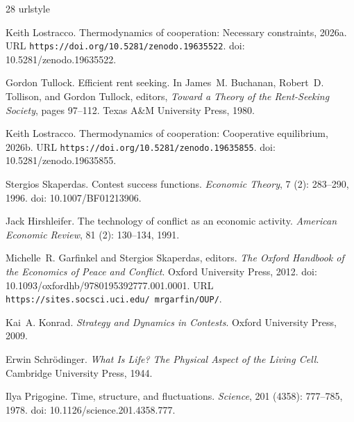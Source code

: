 \documentclass[11pt]{article}
\theoremstyle{plain}
\theoremstyle{definition}
\theoremstyle{remark}
\begin{document}
\begin{thebibliography}{28}
\providecommand{\natexlab}[1]{#1}
\providecommand{\url}[1]{\texttt{#1}}
\expandafter\ifx\csname urlstyle\endcsname\relax
  \providecommand{\doi}[1]{doi: #1}\else
  \providecommand{\doi}{doi: \begingroup \urlstyle{rm}\Url}\fi

\bibitem[Lostracco(2026{\natexlab{a}})]{TC-I}
Keith Lostracco.
\newblock Thermodynamics of cooperation: Necessary constraints,
  2026{\natexlab{a}}.
\newblock URL \url{https://doi.org/10.5281/zenodo.19635522}.
\newblock \doi{10.5281/zenodo.19635522}.

Gordon Tullock.
\newblock Efficient rent seeking.
\newblock In James~M. Buchanan, Robert~D. Tollison, and Gordon Tullock,
  editors, \emph{Toward a Theory of the Rent-Seeking Society}, pages 97--112.
  Texas A\&M University Press, 1980.

\bibitem[Lostracco(2026{\natexlab{b}})]{TC-V}
Keith Lostracco.
\newblock Thermodynamics of cooperation: Cooperative equilibrium,
  2026{\natexlab{b}}.
\newblock URL \url{https://doi.org/10.5281/zenodo.19635855}.
\newblock \doi{10.5281/zenodo.19635855}.

Stergios Skaperdas.
\newblock Contest success functions.
\newblock \emph{Economic Theory}, 7 (2): 283--290, 1996.
\newblock \doi{10.1007/BF01213906}.

Jack Hirshleifer.
\newblock The technology of conflict as an economic activity.
\newblock \emph{American Economic Review}, 81 (2): 130--134,
  1991.

Michelle~R. Garfinkel and Stergios Skaperdas, editors.
\newblock \emph{The Oxford Handbook of the Economics of Peace and Conflict}.
\newblock Oxford University Press, 2012.
\newblock \doi{10.1093/oxfordhb/9780195392777.001.0001}.
\newblock URL \url{https://sites.socsci.uci.edu/~mrgarfin/OUP/}.

Kai~A. Konrad.
\newblock \emph{Strategy and Dynamics in Contests}.
\newblock Oxford University Press, 2009.

Erwin Schr{\"o}dinger.
\newblock \emph{What Is Life? The Physical Aspect of the Living Cell}.
\newblock Cambridge University Press, 1944.

Ilya Prigogine.
\newblock Time, structure, and fluctuations.
\newblock \emph{Science}, 201 (4358): 777--785, 1978.
\newblock \doi{10.1126/science.201.4358.777}.


\end{thebibliography}
\end{document}
